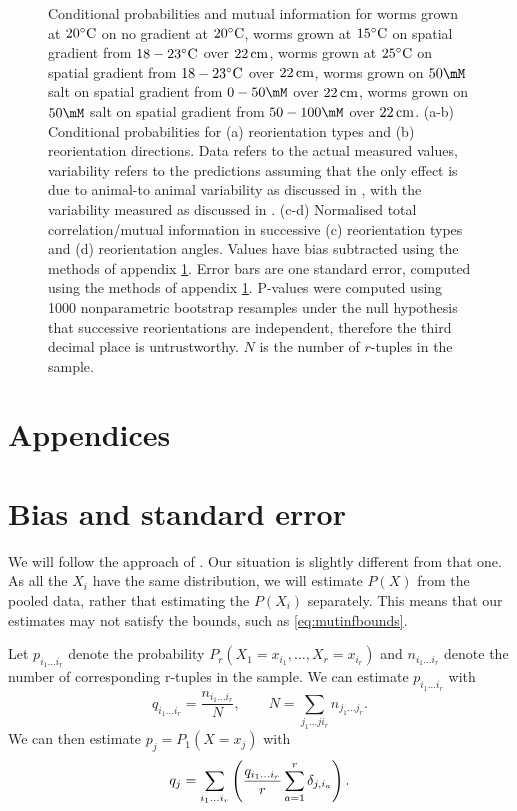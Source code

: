 \documentclass[12pt]{article}
\begin{document}
\begin{figure}
\begin{center}
  \end{center}
  \caption{Conditional probabilities and mutual information for worms grown at $20^\circ\mathrm{C}$ on no gradient at $20^\circ\mathrm{C}$, 
  worms grown at $15^\circ\mathrm{C}$ on spatial gradient from $18-23^\circ\mathrm{C}$ over $22\,\mathrm{cm}$, 
  worms grown at $25^\circ\mathrm{C}$ on spatial gradient from $18-23^\circ\mathrm{C}$ over $22\,\mathrm{cm}$, 
  worms grown on $50\mM$ salt on spatial gradient from $0-50\mM$ over $22\,\mathrm{cm}$,
  worms grown on $50\mM$ salt on spatial gradient from $50-100\mM$ over $22\,\mathrm{cm}$.
  (a-b) Conditional probabilities for 
  (a) reorientation types and 
  (b) reorientation directions.
  Data refers to the actual measured values, variability refers to the predictions assuming that the only effect is due to animal-to animal variability as discussed in , with the variability measured as discussed in .
  (c-d) Normalised total correlation/mutual information in successive 
  (c) reorientation types and 
  (d) reorientation angles.  
  Values have bias subtracted using the methods of appendix \ref{sec:stderr}. Error bars are one standard error, computed using the methods of appendix \ref{sec:stderr}. 
  P-values were computed using 1000 nonparametric bootstrap resamples under the null hypothesis that successive reorientations are independent, therefore the third decimal place is untrustworthy. 
  $N$ is the number of $r$-tuples in the sample.} \label{fig:binaryresults}
\end{figure}






\appendix\section*{Appendices}

\section{Bias and standard error}\label{sec:stderr}

We will follow the approach of \cite{Roulston1999}. Our situation is slightly different from that one. As all the $X_i$ have the same distribution, we will estimate $P(X)$ from the pooled data, rather that estimating the $P(X_i)$ separately. This means that our estimates may not satisfy the bounds, such as \eqref{eq:mutinfbounds}.

Let $p_{i_1\ldots i_r}$ denote the probability $P_r(X_1=x_{i_1},\ldots,X_r=x_{i_r})$ and $n_{i_1\ldots i_r}$ denote the number of corresponding r-tuples in the sample. We can estimate $p_{i_1\ldots i_r}$ with
%
\begin{equation}\label{eq:tupprob}
  q_{i_1\ldots i_r} = \frac{n_{i_1\ldots i_r}}{N},
  \qquad
  N = \sum_{j_1\ldots ji_r} n_{j_1\ldots j_r}.
\end{equation}
%
We can then estimate $p_{j}=P_1(X=x_{j})$ with
%
\begin{equation}\label{eq:singprob}
  q_j = \sum_{i_1\ldots i_r}\left (  \frac{q_{i_1\ldots i_r}}{r} \sum_{a=1}^r \delta_{j,i_a} \right ).
\end{equation}
%
\end{document}
